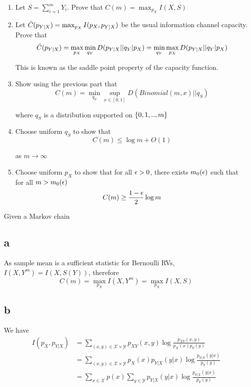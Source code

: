\documentclass{article}
\begin{document}
\begin{enumerate}[label=(\alph*)]
    \item Let $S = \sum_{i=1}^m Y_i$. Prove that $C(m) = \max_{p_X} I(X, S)$

    \item Let $\Tilde{C}(p_{Y|X}) = \max_{p_X} I (p_X, p_{Y|X})$ be the usual information channel capacity. Prove that
    $$
        \Tilde{C}(p_{Y|X}) = \max_{p_X} \min_{q_Y} D(p_{Y|X} || q_Y|p_X) = \min_{q_Y} \max_{p_X} D(p_{Y|X} || q_Y|p_X)
    $$

    This is known as the saddle point property of the capacity function.

    \item Show using the previous part that
    $$
        C(m) = \min_{q_S} \sup_{x \in [0, 1]} D(Binomial(m, x) || q_S)
    $$

    where $q_S$ is a distribution supported on $\{0, 1, .., m\}$

    \item Choose uniform $q_S$ to show that
    $$
        C(m) \leq \log m + O(1)
    $$

    as $m \to \infty$

    \item Choose uniform $p_X$ to show that for all $\epsilon > 0$, there exists $m_0(\epsilon)$ such that for all $m > m_0(\epsilon)$
    $$
        C(m) \geq \frac{1-\epsilon}{2} \log m
    $$

\end{enumerate}

Given a Markov chain

\subsection{a}
\begin{center}
\end{center}

As sample mean is a sufficient statistic for Bernoulli RVs, $I(X, Y^m) = I(X, S(Y))$, therefore
$$
    C(m) = \max_{p_X} I(X, Y^m) = \max_{p_X} I(X, S)
$$

\subsection{b}

We have
\begin{align*}
    I(p_X, p_{Y|X})
    &= \sum_{(x, y) \in \mathcal{X} \times \mathcal{Y}} p_{XY}(x, y) \log \frac{p_{XY}(x, y)}{p_X(x) p_Y(y)} \\
    &= \sum_{(x, y) \in \mathcal{X} \times \mathcal{Y}} p_X(x) p_{Y|X}(y | x)  \log \frac{p_{Y|X}(y | x)}{p_Y(y)} \\
    &= \sum_{x \in \mathcal{X}}  p(x) \sum_{y \in \mathcal{Y}} p_{Y|X}(y | x)  \log \frac{p_{Y|X}(y | x)}{p_Y(y)} \\
\end{align*}
\end{document}
